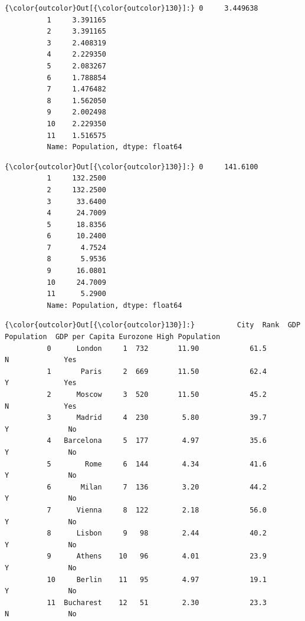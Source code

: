 \documentclass[11pt]{article}
\begin{document}
\begin{Verbatim}[commandchars=\\\{\}]
{\color{outcolor}Out[{\color{outcolor}130}]:} 0     3.449638
          1     3.391165
          2     3.391165
          3     2.408319
          4     2.229350
          5     2.083267
          6     1.788854
          7     1.476482
          8     1.562050
          9     2.002498
          10    2.229350
          11    1.516575
          Name: Population, dtype: float64
\end{Verbatim}
            
\begin{Verbatim}[commandchars=\\\{\}]
{\color{outcolor}Out[{\color{outcolor}130}]:} 0     141.6100
          1     132.2500
          2     132.2500
          3      33.6400
          4      24.7009
          5      18.8356
          6      10.2400
          7       4.7524
          8       5.9536
          9      16.0801
          10     24.7009
          11      5.2900
          Name: Population, dtype: float64
\end{Verbatim}
            
\begin{Verbatim}[commandchars=\\\{\}]
{\color{outcolor}Out[{\color{outcolor}130}]:}          City  Rank  GDP  Population  GDP per Capita Eurozone High Population
          0      London     1  732       11.90            61.5        N             Yes
          1       Paris     2  669       11.50            62.4        Y             Yes
          2      Moscow     3  520       11.50            45.2        N             Yes
          3      Madrid     4  230        5.80            39.7        Y              No
          4   Barcelona     5  177        4.97            35.6        Y              No
          5        Rome     6  144        4.34            41.6        Y              No
          6       Milan     7  136        3.20            44.2        Y              No
          7      Vienna     8  122        2.18            56.0        Y              No
          8      Lisbon     9   98        2.44            40.2        Y              No
          9      Athens    10   96        4.01            23.9        Y              No
          10     Berlin    11   95        4.97            19.1        Y              No
          11  Bucharest    12   51        2.30            23.3        N              No
\end{Verbatim}
            
\end{document}
